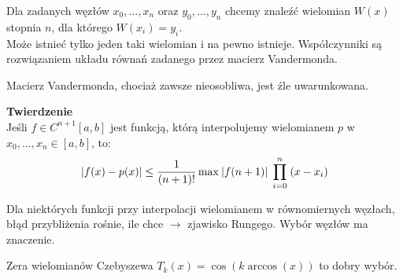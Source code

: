 Dla zadanych węzłów \( x_0, \dots, x_n \) oraz \( y_0, \dots, y_n \) chcemy znaleźć wielomian \( W(x) \) stopnia \( n \), dla którego \( W(x_i) = y_i \). \\
Może istnieć tylko jeden taki wielomian i na pewno istnieje. Współczynniki są rozwiązaniem układu równań zadanego przez macierz Vandermonda.
\begin{warning}
    Macierz Vandermonda, chociaż zawsze nieosobliwa, jest źle uwarunkowana.
\end{warning}

\textbf{Twierdzenie} \\
Jeśli \( f \in C^{n+1}[a, b] \) jest funkcją, którą interpolujemy wielomianem \( p \) w \( x_0, \dots, x_n \in [a, b] \), to:
\[
    \abs{f(x) - p(x)} \leq \frac{1}{(n + 1)!} \max\:\abs{f(n+1)}\; \prod_{i=0}^{n}\; (x - x_i)
\]
\begin{warning}
    Dla niektórych funkcji przy interpolacji wielomianem w równomiernych węzłach, błąd przybliżenia rośnie, ile chce \( \rightarrow \) zjawisko Rungego. Wybór węzłów ma znaczenie.
\end{warning}
Zera wielomianów Czebyszewa \( T_k(x) = \cos(k \arccos(x)) \) to dobry wybór.